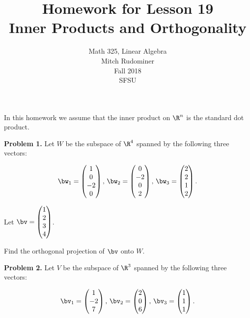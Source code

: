 \documentclass[oneside,12pt]{amsart}
\begin{document}
\title{Homework for Lesson 19 \\ Inner Products and Orthogonality}
\author{Math 325, Linear Algebra \\ Mitch Rudominer \\ Fall 2018 \\ SFSU }
\date{}

\maketitle

\bigskip

In this homework we assume that the inner product on $\R^n$ is the standard
dot product.

\bigskip

\textbf{Problem 1.} Let $W$ be the subspace of $\R^4$ spanned by the
following three vectors:

$$
\bw_1=
\begin{pmatrix}
1  \\
0  \\
-2 \\
0
\end{pmatrix}
\text{, }
\bw_2=
\begin{pmatrix}
0 \\
-2\\
0 \\
2
\end{pmatrix}
\text{, }
\bw_3=
\begin{pmatrix}
2 \\
2 \\
1 \\
2
\end{pmatrix}
.$$

Let $\bv=
\begin{pmatrix}
1 \\
2 \\
3 \\
4
\end{pmatrix}
$.

\bigskip

Find the orthogonal projection of $\bv$ onto $W$.

\bigskip
\bigskip
\bigskip
\bigskip

\textbf{Problem 2.} Let $V$ be the subspace of $\R^3$ spanned by the following
three vectors:

$$
\bv_1=
\begin{pmatrix}
1  \\
-2  \\
7   \\
\end{pmatrix}
\text{, }
\bv_2=
\begin{pmatrix}
2 \\
0\\
6 \\
\end{pmatrix}
\text{, }
\bv_3=
\begin{pmatrix}
1 \\
1 \\
1 \\
\end{pmatrix}
.$$
\end{document}
